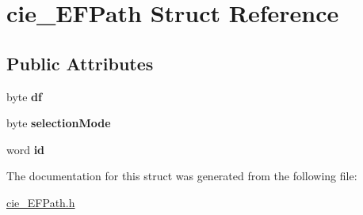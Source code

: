 \hypertarget{structcie__EFPath}{}\section{cie\+\_\+\+E\+F\+Path Struct Reference}
\label{structcie__EFPath}
\subsection*{Public Attributes}
\begin{DoxyCompactItemize}
\item 
byte {\bfseries df}\hypertarget{structcie__EFPath_aac7d0e966e9914154715f527cd5553db}{}\label{structcie__EFPath_aac7d0e966e9914154715f527cd5553db}

\item 
byte {\bfseries selection\+Mode}\hypertarget{structcie__EFPath_afc743a4370310a082c0c3c2b56e58dc5}{}\label{structcie__EFPath_afc743a4370310a082c0c3c2b56e58dc5}

\item 
word {\bfseries id}\hypertarget{structcie__EFPath_a2ffe65e36ee05b04e461764e9271f876}{}\label{structcie__EFPath_a2ffe65e36ee05b04e461764e9271f876}

\end{DoxyCompactItemize}


The documentation for this struct was generated from the following file\+:\begin{DoxyCompactItemize}
\item 
\hyperlink{cie__EFPath_8h}{cie\+\_\+\+E\+F\+Path.\+h}\end{DoxyCompactItemize}
